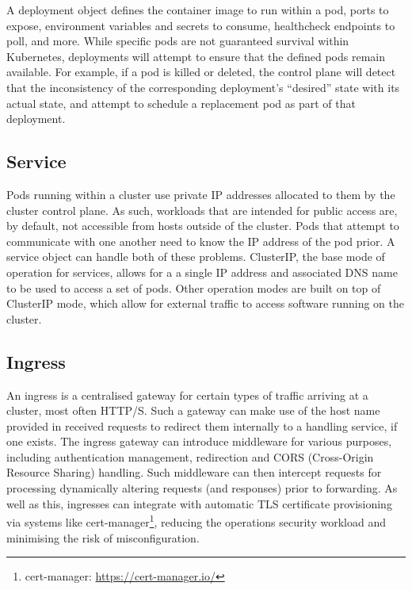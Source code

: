 A deployment object defines the container image to run within a pod, ports to expose, environment variables and secrets to consume, healthcheck endpoints to poll, and more. While specific pods are not guaranteed survival within Kubernetes, deployments will attempt to ensure that the defined pods remain available. For example, if a pod is killed or deleted, the control plane will detect that the inconsistency of the corresponding deployment's ``desired'' state with its actual state, and attempt to schedule a replacement pod as part of that deployment.

\subsection{Service}

Pods running within a cluster use private IP addresses allocated to them by the cluster control plane. As such, workloads that are intended for public access are, by default, not accessible from hosts outside of the cluster. Pods that attempt to communicate with one another need to know the IP address of the pod prior. A service object can handle both of these problems. ClusterIP, the base mode of operation for services, allows for a a single IP address and associated DNS name to be used to access a set of pods. Other operation modes are built on top of ClusterIP mode, which allow for external traffic to access software running on the cluster.

\subsection{Ingress}

An ingress is a centralised gateway for certain types of traffic arriving at a cluster, most often HTTP/S. Such a gateway can make use of the host name provided in received requests to redirect them internally to a handling service, if one exists. The ingress gateway can introduce middleware for various purposes, including authentication management, redirection and CORS (Cross-Origin Resource Sharing) handling. Such middleware can then intercept requests for processing dynamically altering requests (and responses) prior to forwarding. As well as this, ingresses can integrate with automatic TLS certificate provisioning via systems like cert-manager\footnote{cert-manager: \url{https://cert-manager.io/}}, reducing the operations security workload and minimising the risk of misconfiguration.